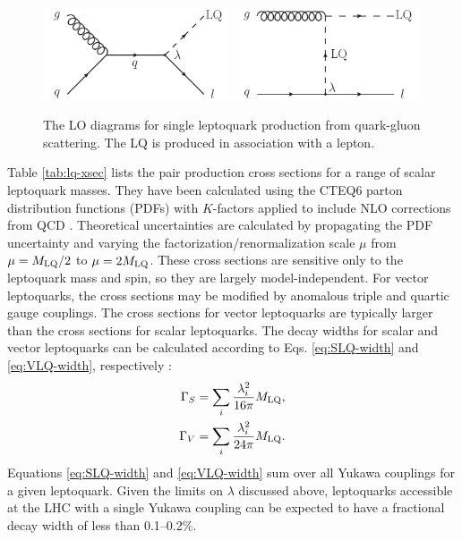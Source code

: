 \begin{figure}[hbt]
\begin{center}
\includegraphics[width=0.49\textwidth]{figures/LO_FD_single_LQ_a.pdf}
\includegraphics[width=0.49\textwidth]{figures/LO_FD_single_LQ_b.pdf}
\caption{The LO diagrams for single leptoquark production from quark-gluon scattering. The LQ is produced in association with a lepton.}
\label{fig:lq-single}
\end{center}
\end{figure}

Table \ref{tab:lq-xsec} lists the pair production cross sections for a range of scalar leptoquark masses. They have been calculated using the CTEQ6 parton distribution functions (PDFs) \cite{CTEQ6r1,CTEQ6r2} with $K$-factors applied to include NLO corrections from QCD \cite{LQxsec}. Theoretical uncertainties are calculated by propagating the PDF uncertainty and varying the factorization/renormalization scale $\mu$ from $\mu=M_{\text{LQ}}/2$ to $\mu=2M_{\text{LQ}}$. These cross sections are sensitive only to the leptoquark mass and spin, so they are largely model-independent. For vector leptoquarks, the cross sections may be modified by anomalous triple and quartic gauge couplings. The cross sections for vector leptoquarks are typically larger than the cross sections for scalar leptoquarks. The decay widths for scalar and vector leptoquarks can be calculated according to Eqs. \eqref{eq:SLQ-width} and \eqref{eq:VLQ-width}, respectively \cite{BRW}:
\begin{align}
\label{eq:SLQ-width} \Gamma_{S} &= \sum_{i}{\frac{\lambda_{i}^{2}}{16\pi}M_{\text{LQ}}}, \\
\label{eq:VLQ-width} \Gamma_{V} &= \sum_{i}{\frac{\lambda_{i}^{2}}{24\pi}M_{\text{LQ}}}.
\end{align}
Equations \eqref{eq:SLQ-width} and \eqref{eq:VLQ-width} sum over all Yukawa couplings for a given leptoquark. Given the limits on $\lambda$ discussed above, leptoquarks accessible at the LHC with a single Yukawa coupling can be expected to have a fractional decay width of less than 0.1--0.2\%.

